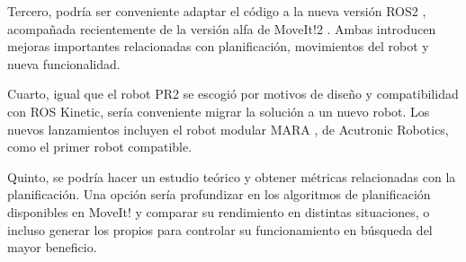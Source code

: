 \documentclass[12pt,spanish,chapterprefix, numbers=noenddot]{book}
\numberwithin{equation}{section}
\numberwithin{figure}{section}
\begin{document}
Tercero, podría ser conveniente adaptar el código a la nueva versión ROS2 \cite{ros2}, acompañada recientemente de la versión alfa de MoveIt!2 \cite{moveit2}. Ambas introducen mejoras importantes relacionadas con planificación, movimientos del robot y nueva funcionalidad. 

Cuarto, igual que el robot PR2 se escogió por motivos de diseño y compatibilidad con ROS Kinetic, sería conveniente migrar la solución a un nuevo robot. Los nuevos lanzamientos incluyen el robot modular MARA \cite{mara}, de Acutronic Robotics, como el primer robot compatible.

Quinto, se podría hacer un estudio teórico y obtener métricas relacionadas con la planificación. Una opción sería profundizar en los algoritmos de planificación disponibles en MoveIt! y comparar su rendimiento en distintas situaciones, o incluso generar los propios para controlar su funcionamiento en búsqueda del mayor beneficio. 

\printbibliography[heading=bibintoc]
\printindex
\end{document}
